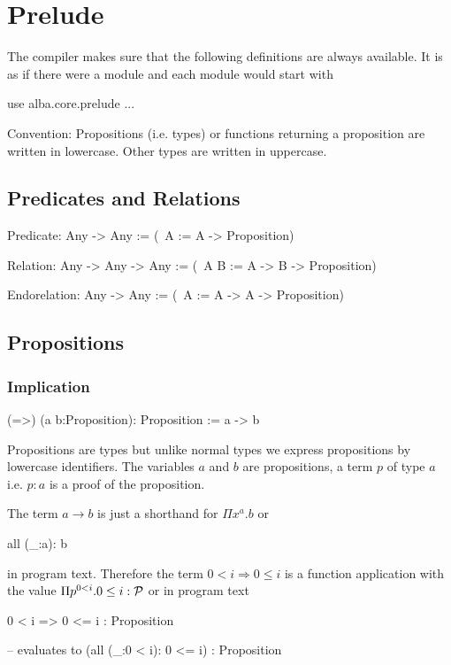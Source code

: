 \section{Prelude}

The compiler makes sure that the following definitions are always
available. It is as if there were a module  and each
module would start with
\begin{alba}
  use
     alba.core.prelude
     ...
\end{alba}


Convention: Propositions (i.e. types) or functions returning a proposition are
written in lowercase. Other types are written in uppercase.


\subsection{Predicates and Relations}
\label{sec:predicates-and-relations}

\begin{alba}
  Predicate: Any -> Any
    := (\ A := A -> Proposition)

  Relation: Any -> Any -> Any
    := (\ A B := A -> B -> Proposition)

  Endorelation: Any -> Any
    := (\ A := A -> A -> Proposition)
\end{alba}
\vskip 2mm





\subsection{Propositions}
\label{sec:prelude-propositions}


\subsubsection{Implication}
%
\begin{alba}
  (=>) (a b:Proposition): Proposition
    := a -> b
\end{alba}

Propositions are types but unlike normal types we express propositions by
lowercase identifiers. The variables $a$ and $b$ are propositions, a term $p$
of type $a$ i.e. $p:a$ is a proof of the proposition.

The term $a\to b$ is just a shorthand for $\Pi x^a.b$ or
\begin{alba}
  all (_:a): b
\end{alba}
in program text. Therefore the term $0 < i \Rightarrow 0 \le i$ is a function
application with the value $\Pi p^{0 < i}. 0 \le i : {\cal{P}}$ or in program text
\begin{alba}
  0 < i => 0 <= i           : Proposition

  -- evaluates to
  (all (_:0 < i): 0 <= i)  : Proposition
\end{alba}
\vskip 2mm





